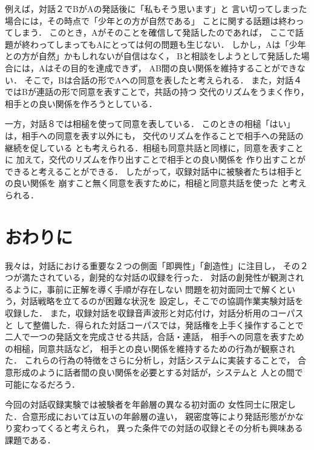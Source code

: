 例えば，対話２でBがAの発話後に「私もそう思います」と
言い切ってしまった場合には，その時点で「少年との方が自然である」
ことに関する話題は終わってしまう．
このとき，Aがそのことを確信して発話したのであれば，
ここで話題が終わってしまってもAにとっては何の問題も生じない．
しかし，Aは「少年との方が自然」かもしれないが自信はなく，
Bと相談をしようとして発話した場合には，Aはその目的を達成できず，
AB間の良い関係を維持することができない．
そこで，Bは合話の形でAへの同意を表したと考えられる．
また，対話４ではBが連話の形で同意を表すことで，共話の持つ
交代のリズムをうまく作り，相手との良い関係を作ろうとしている．

一方，対話８では相槌を使って同意を表している．
このときの相槌「はい」は，相手への同意を表す以外にも，
交代のリズムを作ることで相手への発話の継続を促している
とも考えられる．相槌も同意共話と同様に，同意を表すことに
加えて，交代のリズムを作り出すことで相手との良い関係を
作り出すことができると考えることができる．
したがって，収録対話中に被験者たちは相手との良い関係を
崩すこと無く同意を表すために，相槌と同意共話を使った
と考えられる．

\section{おわりに}
我々は，対話における重要な２つの側面「即興性」「創造性」に注目し，
その２つが満たされている，創発的な対話の収録を行った．
対話の創発性が観測されるように，事前に正解を導く手順が存在しない
問題を初対面同士で解くという，対話戦略を立てるのが困難な状況を
設定し，そこでの協調作業実験対話を収録した．
また，収録対話を収録音声波形と対応付け，対話分析用のコーパスと
して整備した．得られた対話コーパスでは，発話権を上手く操作することで
二人で一つの発話文を完成させる共話，合話・連話，
相手への同意を表すための相槌，同意共話など，
相手との良い関係を維持するための行為が観察された．
これらの行為の特徴をさらに分析し，対話システムに実装することで，
合意形成のように話者間の良い関係を必要とする対話が，システムと
人との間で可能になるだろう．

今回の対話収録実験では被験者を年齢層の異なる初対面の
女性同士に限定した．合意形成においては互いの年齢層の違い，
親密度等により発話形態がかなり変わってくると考えられ，
異った条件での対話の収録とその分析も興味ある課題である．





